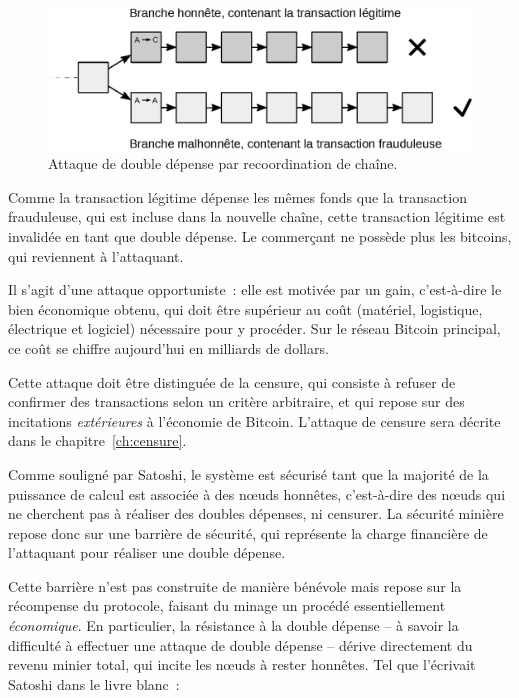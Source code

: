 \begin{figure}[h]
  \centering
  \includegraphics[scale=0.7]{img/mining-attack-doublespending.eps}
  \caption{Attaque de double dépense par recoordination de chaîne.}
  \label{fig:doublespending-attack}
\end{figure}

Comme la transaction légitime dépense les mêmes fonds que la transaction frauduleuse, qui est incluse dans la nouvelle chaîne, cette transaction légitime est invalidée en tant que double dépense. Le commerçant ne possède plus les bitcoins, qui reviennent à l'attaquant.

Il s'agit d'une attaque opportuniste~: elle est motivée par un gain, c'est-à-dire le bien économique obtenu, qui doit être supérieur au coût (matériel, logistique, électrique et logiciel) nécessaire pour y procéder. Sur le réseau Bitcoin principal, ce coût se chiffre aujourd'hui en milliards de dollars.

Cette attaque doit être distinguée de la censure, qui consiste à refuser de confirmer des transactions selon un critère arbitraire, et qui repose sur des incitations \emph{extérieures} à l'économie de Bitcoin. L'attaque de censure sera décrite dans le chapitre~\ref{ch:censure}.


Comme souligné par Satoshi, le système est sécurisé tant que la majorité de la puissance de calcul est associée à des nœuds honnêtes, c'est-à-dire des nœuds qui ne cherchent pas à réaliser des doubles dépenses, ni censurer. La sécurité minière repose donc sur une barrière de sécurité, qui représente la charge financière de l'attaquant pour réaliser une double dépense.

Cette barrière n'est pas construite de manière bénévole mais repose sur la récompense du protocole, faisant du minage un procédé essentiellement \emph{économique}. En particulier, la résistance à la double dépense -- à savoir la difficulté à effectuer une attaque de double dépense -- dérive directement du revenu minier total, qui incite les nœuds à rester honnêtes. Tel que l'écrivait Satoshi dans le livre blanc~:

